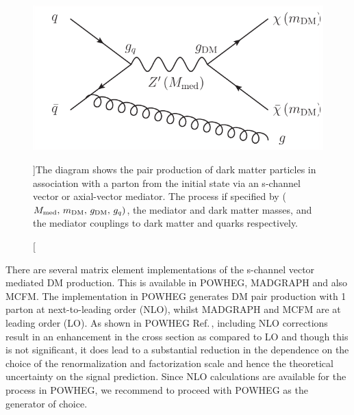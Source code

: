 \begin{figure}[t!]
\centering
\includegraphics[width=0.5\linewidth]{figures/monoLHC.pdf}
\caption[][\baselineskip]{The diagram shows the pair production of dark matter particles in association with a parton from the initial state via an s-channel vector or axial-vector mediator. The process if specified by ($M_{\rm{med}} ,\, m_{\rm{DM}} ,\, g_{\rm{DM}} ,\, g_q)$, the mediator and dark matter masses, and the mediator couplings to dark matter and quarks respectively.}
\label{fig:OP}
\end{figure}


There are several matrix element implementations of the s-channel vector mediated DM production. This is available in POWHEG, MADGRAPH and also MCFM.
The implementation in POWHEG generates DM pair production with 1 parton at next-to-leading order (NLO), whilst MADGRAPH and MCFM are at leading order (LO). As shown in POWHEG Ref.\,\cite{Haisch:2013ata}, including NLO corrections result in an enhancement in the cross section as compared to LO and though this is not significant, it does lead to a substantial reduction in the dependence on the choice of the renormalization and factorization scale and hence the theoretical uncertainty on the signal prediction. 
Since NLO calculations are available for the process in POWHEG, we recommend to proceed with POWHEG as the generator of choice. 




